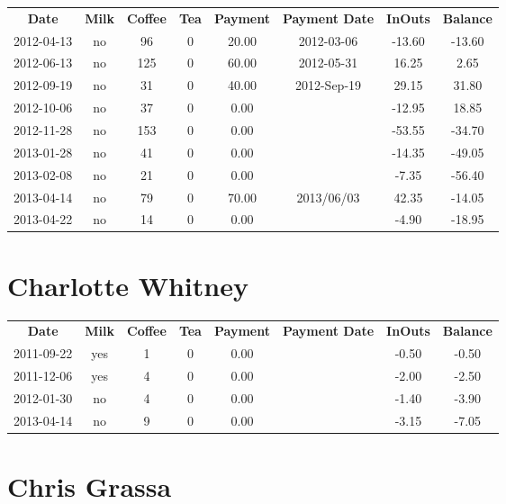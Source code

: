 \begin{center}
\begin{tabular}{cccccccc}
\textbf{Date} & \textbf{Milk} & \textbf{Coffee} & \textbf{Tea} & \textbf{Payment} & \textbf{Payment Date} & \textbf{InOuts} & \textbf{Balance} \\
2012-04-13 & no &  96 & 0 & 20.00 & 2012-03-06 & -13.60 & -13.60\\ 
2012-06-13 & no & 125 & 0 & 60.00 & 2012-05-31 &  16.25 &   2.65\\ 
2012-09-19 & no &  31 & 0 & 40.00 & 2012-Sep-19 &  29.15 &  31.80\\ 
2012-10-06 & no &  37 & 0 &  0.00 &  & -12.95 &  18.85\\ 
2012-11-28 & no & 153 & 0 &  0.00 &  & -53.55 & -34.70\\ 
2013-01-28 & no &  41 & 0 &  0.00 &  & -14.35 & -49.05\\ 
2013-02-08 & no &  21 & 0 &  0.00 &  &  -7.35 & -56.40\\ 
2013-04-14 & no &  79 & 0 & 70.00 & 2013/06/03 &  42.35 & -14.05\\ 
2013-04-22 & no &  14 & 0 &  0.00 &  &  -4.90 & -18.95
\end{tabular}
\end{center}

\section{Charlotte Whitney}

\begin{center}
\begin{tabular}{cccccccc}
\textbf{Date} & \textbf{Milk} & \textbf{Coffee} & \textbf{Tea} & \textbf{Payment} & \textbf{Payment Date} & \textbf{InOuts} & \textbf{Balance} \\
2011-09-22 & yes & 1 & 0 & 0.00 &  & -0.50 & -0.50\\ 
2011-12-06 & yes & 4 & 0 & 0.00 &  & -2.00 & -2.50\\ 
2012-01-30 & no & 4 & 0 & 0.00 &  & -1.40 & -3.90\\ 
2013-04-14 & no & 9 & 0 & 0.00 &  & -3.15 & -7.05
\end{tabular}
\end{center}

\section{Chris Grassa}


